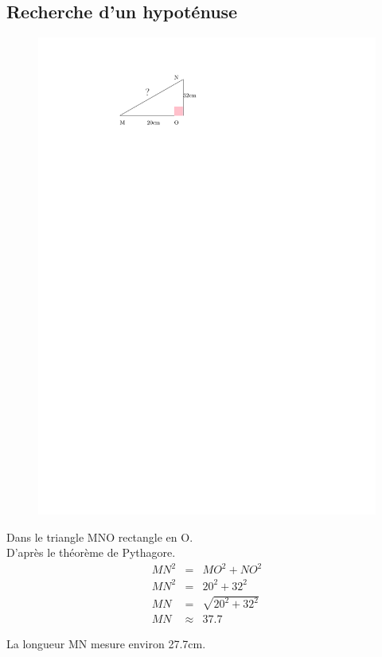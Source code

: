 \documentclass[12pt]{article}
\begin{document}
\begin{multicols}{2}

	\subsection*{Recherche d'un hypoténuse}

	\begin{figure}[H]
		\centering
		\includegraphics[width=0.5\linewidth]{4x1-pythagore/sources/re-h.pdf}
	\end{figure}

	Dans le triangle MNO rectangle en O.\\
	D'après le théorème de Pythagore.
	\begin{eqnarray*}
		MN^2 &=& MO^2 + NO^2 \\
		MN^2 &=& 20^2 + 32^2 \\
		MN   &=& \sqrt{20^2 + 32^2} \\
		MN   &\approx& 37.7
	\end{eqnarray*}

	La longueur MN mesure environ 27.7cm.


\end{multicols}
\end{document}
